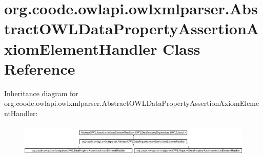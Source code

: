 \hypertarget{classorg_1_1coode_1_1owlapi_1_1owlxmlparser_1_1_abstract_o_w_l_data_property_assertion_axiom_element_handler}{\section{org.\-coode.\-owlapi.\-owlxmlparser.\-Abstract\-O\-W\-L\-Data\-Property\-Assertion\-Axiom\-Element\-Handler Class Reference}
\label{classorg_1_1coode_1_1owlapi_1_1owlxmlparser_1_1_abstract_o_w_l_data_property_assertion_axiom_element_handler}
}
Inheritance diagram for org.\-coode.\-owlapi.\-owlxmlparser.\-Abstract\-O\-W\-L\-Data\-Property\-Assertion\-Axiom\-Element\-Handler\-:\begin{figure}[H]
\begin{center}
\leavevmode
\includegraphics[height=1.578947cm]{classorg_1_1coode_1_1owlapi_1_1owlxmlparser_1_1_abstract_o_w_l_data_property_assertion_axiom_element_handler}
\end{center}
\end{figure}
